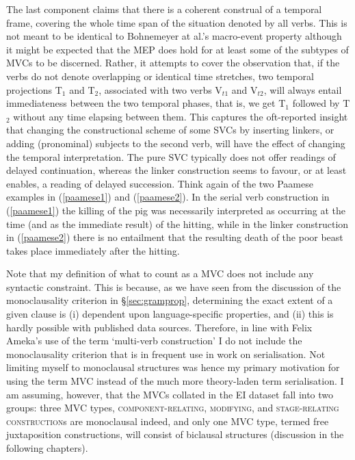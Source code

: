 The last component claims that there is a coherent construal of a temporal frame, covering the whole time span of the situation denoted by all verbs. This is not meant to be identical to Bohnemeyer at al.'s macro-event property although it might be expected that the MEP does hold for at least some of the subtypes of MVCs to be discerned. Rather, it attempts to cover the observation that, if the verbs do not denote overlapping or identical time stretches, two temporal projections T$_1$ and T$_2$, associated with two verbs V$_{t1}$ and V$_{t2}$, will always entail immediateness between the two temporal phases, that is, we get T$_1$ followed by T$_2$ without any time elapsing between them. This captures the oft-reported insight that changing the constructional scheme of some SVCs by inserting linkers, or adding (pronominal) subjects to the second verb, will have the effect of changing the temporal interpretation. The pure SVC typically does not offer readings of delayed continuation, whereas the linker construction seems to favour, or at least enables, a reading of delayed succession. Think again of the two Paamese examples in (\ref{paamese1}) and (\ref{paamese2}). In the serial verb construction in (\ref{paamese1}) the killing of the pig was necessarily interpreted as occurring at the time (and as the immediate result) of the hitting, while in the linker construction in (\ref{paamese2}) there is no entailment that the resulting death of the poor beast takes place immediately after the hitting.

Note that my definition of what to count as a MVC does not include any syntactic constraint. This is because, as we have seen from the discussion of the monoclausality criterion in §\ref{sec:gramprop}, determining the exact extent of a given clause is (i) dependent upon language-specific properties, and (ii) this is hardly possible with published data sources. Therefore, in line with Felix Ameka's use of the term `multi-verb construction' I do not include the monoclausality criterion that is in frequent use in work on serialisation. Not limiting myself to monoclausal structures was hence my primary motivation for using the term MVC instead of the much more theory-laden term serialisation. I am assuming, however, that the MVCs collated in the EI dataset fall into two groups: three MVC types, \textsc{component-relating}, \textsc{modifying}, and \textsc{stage-relating construction}s are monoclausal indeed, and only one MVC type, termed free juxtaposition constructions, will consist of biclausal structures (discussion in the following chapters). 

